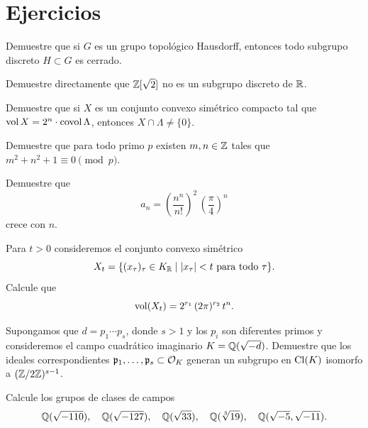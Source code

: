 \pagebreak


\section*{Ejercicios}

\begin{ejercicio}
  Demuestre que si $G$ es un grupo topológico Hausdorff, entonces todo subgrupo
  discreto $H \subset G$ es cerrado.
\end{ejercicio}

\begin{ejercicio}
  Demuestre directamente que $\mathbb{Z} [\sqrt{2}]$ no es un subgrupo discreto de
  $\mathbb{R}$.
\end{ejercicio}

\begin{ejercicio}
  Demuestre que si $X$ es un conjunto convexo simétrico compacto tal que
  $\operatorname{vol} X = 2^n\cdot \operatorname{covol} \Lambda$, entonces $X \cap \Lambda \ne \{ 0 \}$.
\end{ejercicio}

\begin{ejercicio}
  Demuestre que para todo primo $p$ existen $m,n \in \mathbb{Z}$ tales que
  $m^2 + n^2 + 1 \equiv 0 \pmod{p}$.
\end{ejercicio}

\begin{ejercicio}
  Demuestre que
  $$a_n = \left(\frac{n^n}{n!}\right)^2\,\left(\frac{\pi}{4}\right)^n$$
  crece con $n$.
\end{ejercicio}

\begin{ejercicio}
  Para $t > 0$ consideremos el conjunto convexo simétrico
  $$X_t = \{ (x_\tau)_\tau \in K_{\mathbb{R}} \mid |x_\tau| < t\text{ para todo }\tau \}.$$
  Calcule que
  $$\operatorname{vol} (X_t) = 2^{r_1}\,(2\pi)^{r_2}\,t^n.$$
\end{ejercicio}

\begin{ejercicio}
  Supongamos que $d = p_1\cdots p_s$, donde $s > 1$ y los $p_i$ son diferentes
  primos y consideremos el campo cuadrático imaginario $K = \mathbb{Q} (\sqrt{-d})$.
  Demuestre que los ideales correspondientes
  $\mathfrak{p}_1,\ldots,\mathfrak{p}_s \subset \mathcal{O}_K$ generan un subgrupo en
  $\operatorname{Cl} (K)$ isomorfo a $(\mathbb{Z}/2\mathbb{Z})^{s-1}$.
\end{ejercicio}

\begin{ejercicio}
  Calcule los grupos de clases de campos
  \[ \mathbb{Q} (\sqrt{-110}), \quad
     \mathbb{Q} (\sqrt{-127}), \quad
     \mathbb{Q} (\sqrt{33}), \quad
     \mathbb{Q} (\sqrt[3]{19}), \quad
     \mathbb{Q} (\sqrt{-5}, \sqrt{-11}). \]
\end{ejercicio}

